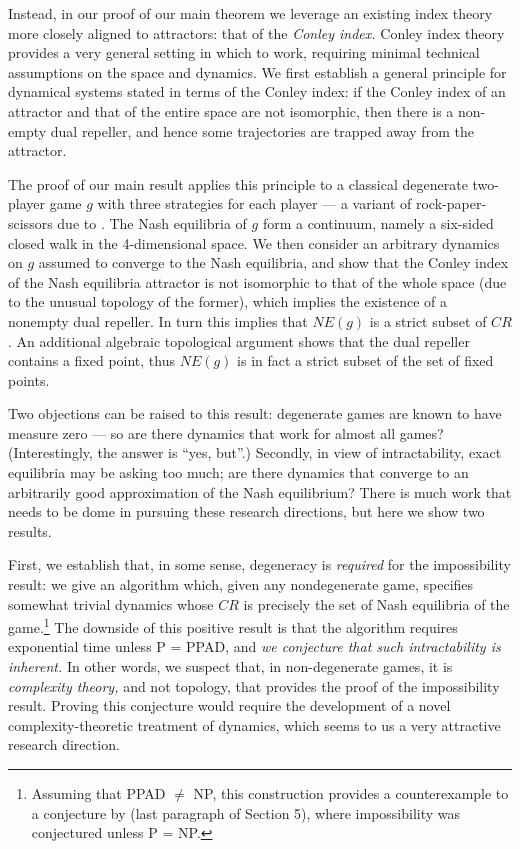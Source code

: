 \documentclass[11pt]{article}
\begin{document}
Instead, in our proof of our main theorem we leverage an existing index theory more closely aligned to attractors: that of the {\em Conley index.}  Conley index theory \citep{conley1978isolated} provides a very general setting in which to work, requiring minimal technical assumptions on the space and dynamics. We first establish a general principle for dynamical systems stated in terms of the Conley index: if the Conley index of an attractor and that of the entire space are not isomorphic, then there is a non-empty dual repeller, and hence some trajectories are trapped away from the attractor. 

The proof of our main result applies this principle to a classical degenerate two-player game $g$ with three strategies for each player --- a variant of rock-paper-scissors due to \citep{kohlberg1986strategic}. The Nash equilibria of $g$ form a continuum, namely a six-sided closed walk in the 4-dimensional space.  We then consider an arbitrary dynamics on $g$ assumed to converge to the Nash equilibria, and show that the Conley index of the Nash equilibria attractor is not isomorphic to that of the whole space (due to the unusual topology of the former), which implies the existence of a nonempty dual repeller.  In turn this implies that $NE(g)$ is a strict subset of $CR$.
An additional algebraic topological argument shows that the dual repeller contains a fixed point, thus $NE(g)$ is in fact a strict subset of the set of fixed points.

Two objections can be raised to this result: degenerate games are known to have measure zero --- so are there dynamics that work for almost all games?  (Interestingly, the answer is ``yes, but''.) Secondly, in view of intractability, exact equilibria may be asking too much; are there dynamics that converge to an arbitrarily good approximation of the Nash equilibrium?  There is much work that needs to be dome in pursuing these research directions, but here we show two results.

First, we establish that, in some sense, degeneracy is {\em required} for the impossibility result: we give an algorithm which, given any nondegenerate game, specifies somewhat trivial dynamics whose $CR$ is precisely the set of Nash equilibria of the game.\footnote{Assuming that PPAD $\neq$ NP, this construction provides a counterexample to a conjecture by \citet{DynMeaningOfTheGame} (last paragraph of Section 5), where impossibility was conjectured unless P = NP.} The downside of this positive result is that the algorithm requires exponential time unless P = PPAD, and {\em we conjecture that such intractability is inherent.}  In other words, we suspect that, in non-degenerate games, it is {\em complexity theory,} and not topology, that provides the proof of the impossibility result. Proving this conjecture would require the development of a novel complexity-theoretic treatment of dynamics, which seems to us a very attractive research direction.
\end{document}
